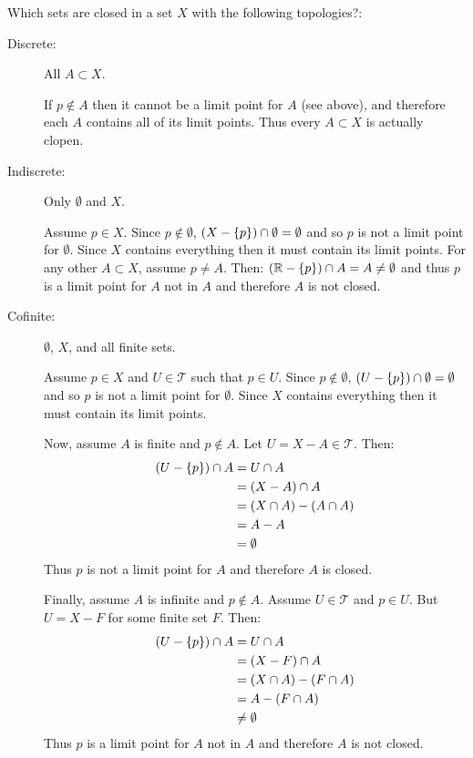 \documentclass[letterpaper,12pt,fleqn]{article}
\newcommand{\T}{\mathscr{T}}
\begin{document}
\begin{example}
  Which sets are closed in a set \(X\) with the following topologies?:
  \begin{description}
  \item[Discrete:]  All \(A\subset X\).

    If \(p\notin A\) then it cannot be a limit point for \(A\) (see above), and therefore each \(A\) contains all
    of its limit points.  Thus every \(A\subset X\) is actually clopen.

  \item[Indiscrete:] Only \(\emptyset\) and \(X\).

    Assume \(p\in X\).  Since \(p\notin\emptyset\), \((X-\{p\})\cap\emptyset=\emptyset\) and so \(p\) is not a
    limit point for \(\emptyset\).  Since \(X\) contains everything then it must contain its limit points.  For any
    other \(A\subset X\), assume \(p\ne A\).  Then: \((\mathbb{R}-\{p\})\cap A=A\ne\emptyset\) and thus \(p\) is a limit
    point for \(A\) not in \(A\) and therefore \(A\) is not closed.

  \item[Cofinite:] \(\emptyset\), \(X\), and all finite sets.

    Assume \(p\in X\) and \(U\in\T\) such that \(p\in U\).  Since \(p\notin\emptyset\),
    \((U-\{p\})\cap\emptyset=\emptyset\) and so \(p\) is not a limit point for \(\emptyset\).  Since \(X\)
    contains everything then it must contain its limit points.

    Now, assume \(A\) is finite and \(p\notin A\).  Let \(U=X-A\in\T\).  Then:
    \begin{align*}
      (U-\{p\})\cap A &= U\cap A \\
      &= (X-A)\cap A \\
      &= (X\cap A)-(A\cap A) \\
      &= A-A \\
      &= \emptyset
    \end{align*}
    Thus \(p\) is not a limit point for \(A\) and therefore \(A\) is closed.

    Finally, assume \(A\) is infinite and \(p\notin A\).  Assume \(U\in\T\) and \(p\in U\).  But \(U=X-F\) for
    some finite set \(F\).  Then:
    \begin{align*}
      (U-\{p\})\cap A &= U\cap A \\
      &= (X-F)\cap A \\
      &= (X\cap A)-(F\cap A) \\
      &= A-(F\cap A) \\
      &\ne \emptyset
    \end{align*}
    Thus \(p\) is a limit point for \(A\) not in \(A\) and therefore \(A\) is not closed.


\end{description}
\end{example}
\end{document}

